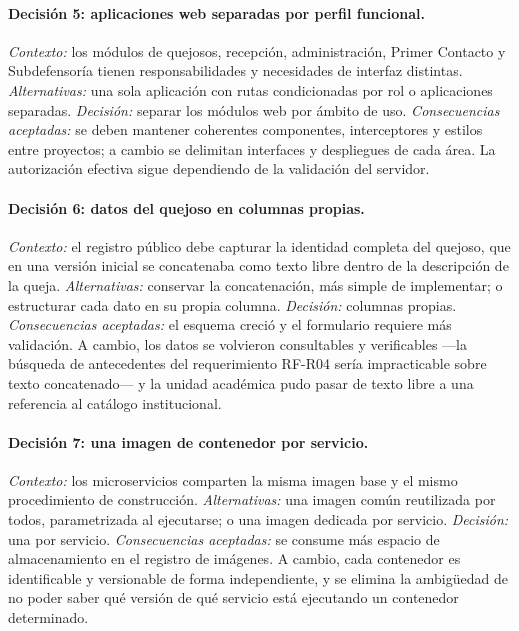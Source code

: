 	\paragraph{Decisión 5: aplicaciones web separadas por perfil funcional.}
	\emph{Contexto:} los módulos de quejosos, recepción, administración, Primer Contacto y
	Subdefensoría tienen responsabilidades y necesidades de interfaz distintas.
	\emph{Alternativas:} una sola aplicación con rutas condicionadas por rol o aplicaciones
	separadas. \emph{Decisión:} separar los módulos web por ámbito de uso.
	\emph{Consecuencias aceptadas:} se deben mantener coherentes componentes, interceptores
	y estilos entre proyectos; a cambio se delimitan interfaces y despliegues de cada área.
	La autorización efectiva sigue dependiendo de la validación del servidor.
	
	\paragraph{Decisión 6: datos del quejoso en columnas propias.}
	\emph{Contexto:} el registro público debe capturar la identidad completa del quejoso, que en una
	versión inicial se concatenaba como texto libre dentro de la descripción de la queja.
	\emph{Alternativas:} conservar la concatenación, más simple de implementar; o estructurar cada
	dato en su propia columna. \emph{Decisión:} columnas propias. \emph{Consecuencias aceptadas:} el
	esquema creció y el formulario requiere más validación. A cambio, los datos se volvieron
	consultables y verificables ---la búsqueda de antecedentes del requerimiento RF-R04 sería
	impracticable sobre texto concatenado--- y la unidad académica pudo pasar de texto libre a una
	referencia al catálogo institucional.
	
	\paragraph{Decisión 7: una imagen de contenedor por servicio.}
	\emph{Contexto:} los microservicios comparten la misma imagen base y el mismo procedimiento de
	construcción. \emph{Alternativas:} una imagen común reutilizada por todos, parametrizada al
	ejecutarse; o una imagen dedicada por servicio. \emph{Decisión:} una por servicio.
	\emph{Consecuencias aceptadas:} se consume más espacio de almacenamiento en el registro de
	imágenes. A cambio, cada contenedor es identificable y versionable de forma independiente, y se
	elimina la ambigüedad de no poder saber qué versión de qué servicio está ejecutando un
	contenedor determinado.
	
